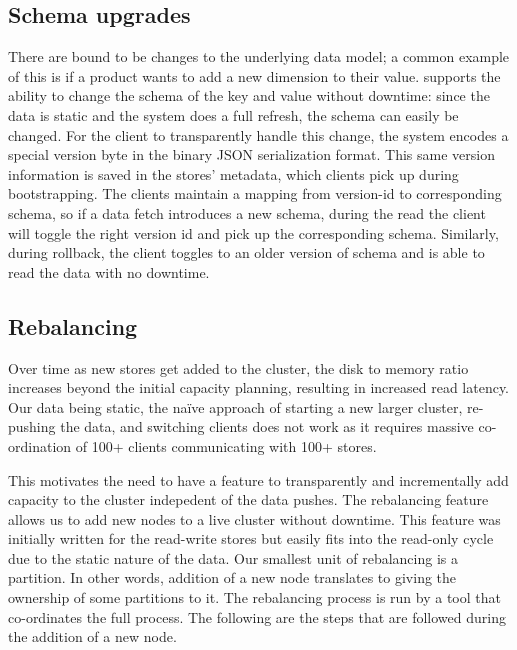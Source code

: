
\subsection{Schema upgrades}
\label{sec:read_only:data_cycle:schema_upgrades}

There are bound to be changes to the underlying data model; a common
example of this is if a product wants to add a new dimension to their
value. \projectname{} supports the ability to change the schema of the
key and value without downtime: since the data is static and the
system does a full refresh, the schema can easily be changed. For the
client to transparently handle this change, the system encodes a
special version byte in the binary JSON serialization format. This
same version information is saved in the stores' metadata, which
clients pick up during bootstrapping. The clients maintain a mapping
from version-id to corresponding schema, so if a data fetch introduces
a new schema, during the read the client will toggle the right version
id and pick up the corresponding schema. Similarly, during rollback,
the client toggles to an older version of schema and is able to read
the data with no downtime. 


\subsection{Rebalancing}
\label{sec:read_only:data_cycle:rebalancing}

Over time as new stores get added to the cluster, the disk to memory
ratio increases beyond the initial capacity planning, resulting in
increased read latency. Our data being static, the na\"{i}ve
approach of starting a new larger cluster, re-pushing the data, and
switching clients does not work as it requires massive co-ordination
of 100+ clients communicating with 100+ stores.

This motivates the need to have a feature to transparently and 
incrementally add capacity to the cluster indepedent of the data pushes. 
The rebalancing feature allows us to add new nodes to a live cluster without 
downtime. This feature was initially written for the read-write stores 
but easily fits into the read-only cycle due to the static nature 
of the data. Our smallest unit of rebalancing is a partition. In 
other words, addition of a new node translates to giving the ownership 
of some partitions to it. The rebalancing process is run by a tool that 
co-ordinates the full process. The following are the steps that
are followed during the addition of a new node. 


